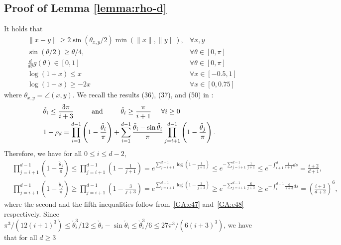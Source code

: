 \documentclass[11pt]{article}
\begin{document}
\subsection{Proof of Lemma \ref{lemma:rho-d}}
It holds that
\begin{align}
&\|x - y\| \geq 2 \sin (\theta_{x, y} / 2) \min(\|x\|, \|y\|), &\forall x, y \label{GA:e4} \\
&\sin(\theta / 2) \geq \theta / 4, &\forall \theta \in [0, \pi] \label{GA:e5} \\
&\frac{d}{d \theta} g(\theta) \in [0, 1] &\forall \theta \in [0, \pi] \label{GA:e13} \\
&\log(1+x) \leq x &\forall x \in [-0.5, 1] \label{GA:e47} \\
&\log(1-x) \geq -2 x &\forall x \in [0, 0.75] \label{GA:e48}
\end{align}
where $\theta_{x, y} = \angle(x, y)$.
We recall the results (36), (37), and (50) in \citep{hand_global_2017}:
\begin{align*}
&\check{\theta}_i \leq \frac{3 \pi}{i + 3}\;\;\;\;\;  \;\;\; \hbox{ and }\;\;\;\;\;  \;\;\; \check{\theta}_i \geq \frac{\pi}{i + 1}\;\;\;\;\; \forall i \geq 0 \\
&1 - \rho_d = \prod_{i = 1}^{d - 1} \left( 1 - \frac{\check{\theta}_{i}}{\pi} \right) + \sum_{i = 1}^{d-1} \frac{\check{\theta}_{i} - \sin \check{\theta}_{i}}{\pi} \prod_{j = i+1}^{d-1} \left( 1 - \frac{\check{\theta}_{j}}{\pi} \right).
\end{align*}
Therefore, we have for all $0 \leq i \leq d - 2$,
\begin{align*}
&\prod_{j = i+1}^{d-1} \left( 1 - \frac{\check{\theta}_{j}}{\pi} \right)
\leq \prod_{j = i+1}^{d-1} \left( 1 - \frac{1}{j + 1} \right) = e^{\sum_{j = i + 1}^{d - 1} \log\left(1 - \frac{1}{j + 1}\right)}
\leq e^{- \sum_{j = i + 1}^{d - 1}  \frac{1}{j + 1}} \leq e^{- \int_{i + 1}^d \frac{1}{s + 1} d s} = \frac{i + 2}{d + 1}, \\
%
&\prod_{j = i+1}^{d-1} \left( 1 - \frac{\check{\theta}_{j}}{\pi} \right)
\geq
\prod_{j = i+1}^{d-1} \left( 1 - \frac{3}{j + 3} \right) = e^{\sum_{j = i + 1}^{d - 1} \log\left(1 - \frac{3}{j + 3}\right)}
\geq e^{- \sum_{j = i + 1}^{d - 1}  \frac{6}{j + 3}} \geq e^{- \int_{i}^{d - 1} \frac{6}{s + 3} d s} = \left(\frac{i + 3}{d + 2}\right)^6,
\end{align*}
where the second and the fifth inequalities follow from~\eqref{GA:e47} and~\eqref{GA:e48} respectively.
Since $\pi^3 / (12 (i + 1)^3) \leq \check{\theta}_{i}^3 / 12 \leq \check{\theta}_{i} - \sin \check{\theta}_{i} \leq \check{\theta}_{i}^3 / 6 \leq 27 \pi^3 / (6 (i + 3)^3)$, we have that for all $d \geq 3$
\end{document}

